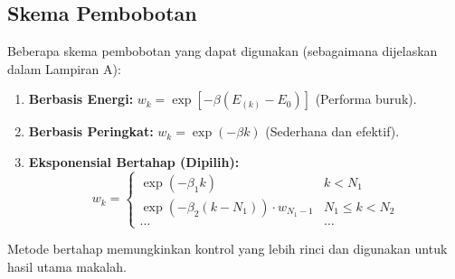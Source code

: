 \subsection{Skema Pembobotan}

Beberapa skema pembobotan yang dapat digunakan (sebagaimana dijelaskan dalam Lampiran A):

\begin{enumerate}
    \item \textbf{Berbasis Energi:} $w_k = \exp [ -\beta(E_{(k)} - E_0) ]$ (Performa buruk).
    \item \textbf{Berbasis Peringkat:} $w_k = \exp(-\beta k)$ (Sederhana dan efektif).
    \item \textbf{Eksponensial Bertahap (Dipilih):}
    $$ w_k = \begin{cases} 
        \exp(-\beta_1 k) & k < N_1 \\
        \exp(-\beta_2 (k - N_1)) \cdot w_{N_1 - 1} & N_1 \le k < N_2 \\
        \dots & \dots
    \end{cases} $$
\end{enumerate}

Metode bertahap memungkinkan kontrol yang lebih rinci dan digunakan untuk hasil utama makalah.
